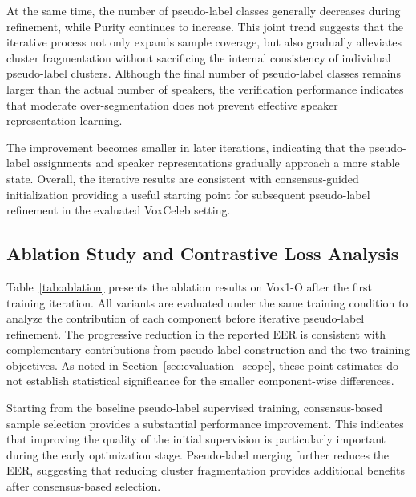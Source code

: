 \documentclass[journal]{IEEEtran}
\begin{document}
At the same time, the number of pseudo-label classes generally
decreases during refinement, while Purity continues to increase. This
joint trend suggests that the iterative process not only expands
sample coverage, but also gradually alleviates cluster fragmentation
without sacrificing the internal consistency of individual
pseudo-label clusters. Although the final number of pseudo-label
classes remains larger than the actual number of speakers, the
verification performance indicates that moderate over-segmentation
does not prevent effective speaker representation learning.

The improvement becomes smaller in later iterations, indicating that
the pseudo-label assignments and speaker representations gradually
approach a more stable state. Overall, the iterative results are
consistent with consensus-guided initialization providing a useful
starting point for subsequent pseudo-label refinement in the evaluated
VoxCeleb setting.





\subsection{Ablation Study and Contrastive Loss Analysis}

Table~\ref{tab:ablation} presents the ablation results on Vox1-O
after the first training iteration.
All variants are evaluated under the same training condition to
analyze the contribution of each component before iterative
pseudo-label refinement.
The progressive reduction in the reported EER is consistent with
complementary contributions from pseudo-label construction and the two
training objectives. As noted in Section~\ref{sec:evaluation_scope}, these
point estimates do not establish statistical significance for the smaller
component-wise differences.

Starting from the baseline pseudo-label supervised training,
consensus-based sample selection provides a substantial performance
improvement.
This indicates that improving the quality of the initial supervision
is particularly important during the early optimization stage.
Pseudo-label merging further reduces the EER, suggesting that reducing
cluster fragmentation provides additional benefits after consensus-based
selection.
\end{document}
